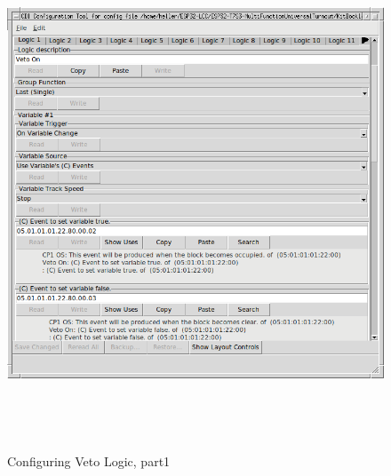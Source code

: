 \documentclass[12pt,twoside]{article}
\begin{document}
\begin{figure}[hbpt]\begin{centering}%
\includegraphics[height=6in]{ExampleSidingCP1-ConfigVetoLogic1a.png}
\caption{Configuring Veto Logic, part1}
\label{fig:ExampleSidingCP1-ConfigVetoLogic1a}
\end{centering}\end{figure}
\end{document}
